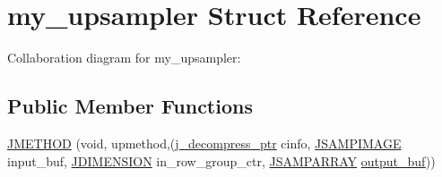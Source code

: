 \hypertarget{structmy__upsampler}{}\section{my\+\_\+upsampler Struct Reference}
\label{structmy__upsampler}


Collaboration diagram for my\+\_\+upsampler\+:
\subsection*{Public Member Functions}
\begin{DoxyCompactItemize}
\item 
\mbox{\hyperlink{structmy__upsampler_a6d4b85127ea561ce45e42fbff490d5d1}{J\+M\+E\+T\+H\+OD}} (void, upmethod,(\mbox{\hyperlink{jpeglib_8h_a00c7d78af44bd26a901c791ccfc1e178}{j\+\_\+decompress\+\_\+ptr}} cinfo, \mbox{\hyperlink{jpeglib_8h_a4bf858e4d42202287e786bdec2f3b62b}{J\+S\+A\+M\+P\+I\+M\+A\+GE}} input\+\_\+buf, \mbox{\hyperlink{jmorecfg_8h_a04ed4674f6f1d0d50ec241531e38274f}{J\+D\+I\+M\+E\+N\+S\+I\+ON}} in\+\_\+row\+\_\+group\+\_\+ctr, \mbox{\hyperlink{jpeglib_8h_ac9d5d1b829ed51769db69a37271a7e91}{J\+S\+A\+M\+P\+A\+R\+R\+AY}} \mbox{\hyperlink{jdct_8h_ad7e4660a191b1a791748dd44d5a7a0ec}{output\+\_\+buf}}))
\end{DoxyCompactItemize}
